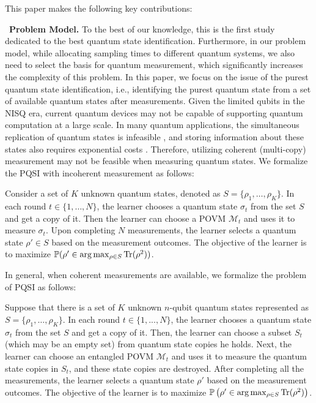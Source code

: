 This paper makes the following key contributions:
    
\textbullet \ \textbf{Problem Model.} To the best of our knowledge, this is the first study dedicated to the best quantum state identification. Furthermore, in our problem model, while allocating sampling times to different quantum systems, we also need to select the basis for quantum measurement, which significantly increases the complexity of this problem. In this paper, we focus on the issue of the purest quantum state identification, i.e., identifying the purest quantum state from a set of available quantum states after measurements. Given the limited qubits in the NISQ era, current quantum devices may not be capable of supporting quantum computation at a large scale. In many quantum applications, the simultaneous replication of quantum states is infeasible \cite{yu2021sample}, and storing information about these states also requires exponential costs \cite{heshami2016quantum}. Therefore, utilizing coherent (multi-copy) measurement may not be feasible when measuring quantum states. We formalize the PQSI with incoherent measurement as follows:

\begin{problem}\label{problem:PQSI_restatement}
Consider a set of $ K $ unknown quantum states, denoted as $ S = \{ \rho_1, \ldots, \rho_K \} $.  In each round $ t \in \{1, \ldots, N\} $, the learner chooses a quantum state $\sigma_t$ from the set $S$ and get a copy of it. Then the learner can choose a POVM $\mathcal{M}_t$ and uses it to measure $\sigma_t$. Upon completing $ N $ measurements, the learner selects a quantum state $ \rho' \in S$ based on the measurement outcomes. The objective of the learner is to maximize $ \mathbb{P}(\rho' \in \arg\max_{\rho \in S} \mathrm{Tr}(\rho^2)) $.
\end{problem}

In general, when coherent measurements are available, we formalize the problem of PQSI as follows:
    
\begin{problem}
    \label{problem:PQSI}
    Suppose that there is a set of $K$ unknown $n$-qubit quantum states represented as $ S = \{ \rho_1, \ldots, \rho_K \} $. In each round $t \in \{1,...,N\}$, the learner chooses a quantum state $\sigma_t$ from the set $S$ and get a copy of it. Then, the learner can choose a subset $S_t$ (which may be an empty set) from quantum state copies he holds. Next, the learner can choose an entangled POVM $\mathcal{M}_t$ and uses it to measure the quantum state copies in $S_t$, and these state copies are destroyed. After completing all the measurements, the learner selects a quantum state $ \rho' $ based on the measurement outcomes. The objective of the learner is to maximize $\mathbb{P}\left(\rho' \in \arg\max_{\rho \in S} \mathrm{Tr}(\rho^2)\right)$.
\end{problem} 


